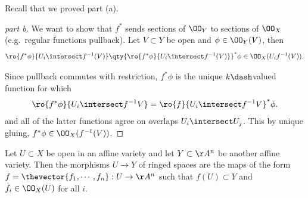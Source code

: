 Recall that we proved part (a).

\begin{proof}[part b]

We want to show that \(f^*\) sends sections of \(\OO_Y\) to sections of
\(\OO_X\) (e.g.~regular functions pullback). Let \(V\subset Y\) be open
and \(\phi \in \OO_Y(V)\), then
\begin{align*}  
\ro{f^* \phi}{U_i \intersect f^{-1} (V)}
\qty{ \ro{f^* \phi}{U_i \intersect f^{-1} (V)} }^* \phi \in 
\OO_X(U_i f^{-1} (V))
.\end{align*}

Since pullback commutes with restriction, \(f^* \phi\) is the unique
\(k\dash\)valued function for which
\begin{align*}  
\ro{f^* \phi}{U_i \intersect f^{-1} V} =
\ro{f}{U_i\intersect f^{-1} V}^* \phi
.\end{align*} and all of the latter functions agree on overlaps
\(U_i \intersect U_j\). This by unique gluing,
\(f^* \phi \in \OO_X(f^{-1}(V))\).

\end{proof}

\begin{proposition}[?]

Let \(U\subset X\) be open in an affine variety and let
\(Y\subset \AA^n\) be another affine variety. Then the morphisms
\(U\to Y\) of ringed spaces are the maps of the form
\(f = \thevector{f_1, \cdots, f_n}: U\to \AA^n\) such that
\(f(U) \subset Y\) and \(f_i \in \OO_X(U)\) for all \(i\).

\end{proposition}

